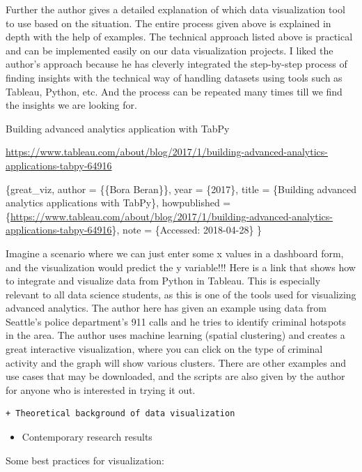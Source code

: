 \documentclass[]{book}
\providecommand{\tightlist}{%
  \setlength{\itemsep}{0pt}\setlength{\parskip}{0pt}}
\theoremstyle{definition}
\theoremstyle{definition}
\theoremstyle{definition}
\theoremstyle{remark}
\begin{document}
Further the author gives a detailed explanation of which data
visualization tool to use based on the situation. The entire process
given above is explained in depth with the help of examples. The
technical approach listed above is practical and can be implemented
easily on our data visualization projects. I liked the author's approach
because he has cleverly integrated the step-by-step process of finding
insights with the technical way of handling datasets using tools such as
Tableau, Python, etc. And the process can be repeated many times till we
find the insights we are looking for.

Building advanced analytics application with TabPy

\url{https://www.tableau.com/about/blog/2017/1/building-advanced-analytics-applications-tabpy-64916}

\citet{misc}\{great\_viz, author = \{\{Bora Beran\}\}, year = \{2017\},
title = \{Building advanced analytics applications with TabPy\},
howpublished =
\{\url{https://www.tableau.com/about/blog/2017/1/building-advanced-analytics-applications-tabpy-64916}\},
note = \{Accessed: 2018-04-28\} \}

Imagine a scenario where we can just enter some x values in a dashboard
form, and the visualization would predict the y variable!!! Here is a
link that shows how to integrate and visualize data from Python in
Tableau. This is especially relevant to all data science students, as
this is one of the tools used for visualizing advanced analytics. The
author here has given an example using data from Seattle's police
department's 911 calls and he tries to identify criminal hotspots in the
area. The author uses machine learning (spatial clustering) and creates
a great interactive visualization, where you can click on the type of
criminal activity and the graph will show various clusters. There are
other examples and use cases that may be downloaded, and the scripts are
also given by the author for anyone who is interested in trying it out.

\begin{verbatim}
+ Theoretical background of data visualization  
\end{verbatim}

\begin{itemize}
\tightlist
\item
  Contemporary research results
\end{itemize}

Some best practices for visualization:
\end{document}
